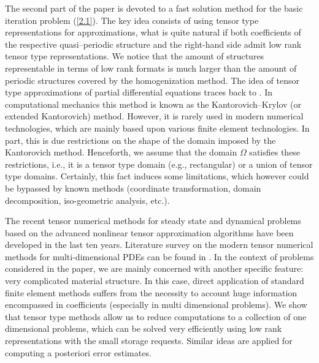 \documentclass[amstex,amstext,amsfonts,epsf,12pt] {amsart}
\begin{document}
The second part of the paper is devoted to a fast solution method for  the basic 
iteration problem (\ref{2.1}). The key idea consists of using 
  tensor type representations for approximations, what is quite natural if 
  both coefficients of the respective quasi--periodic structure and the right-hand side
  admit low rank tensor type representations. 
  We notice  that the amount of structures representable in terms of low rank formats is much
  larger than the amount of  periodic structures covered by the homogenization
  method. The idea of tensor type approximations of partial differential
  equations traces back to \cite{KantorovichKrylov}. In computational
  mechanics this method is known as the Kantorovich--Krylov (or extended Kantorovich) method.
  However, it is rarely used in modern numerical technologies, which are mainly
  based upon various finite element technologies. In part, this is due restrictions
  on the shape of the domain imposed by the Kantorovich method.
  Henceforth, we assume that the domain $\Omega$ satisfies these restrictions,
  i.e.,  it is a tensor type domain (e.g., rectangular) or a union of tensor type domains. 
  Certainly, this fact induces some limitations, which however could be bypassed 
  by known methods (coordinate transformation, domain decomposition, iso-geometric analysis, etc.).
  
  The recent tensor numerical methods for steady state and dynamical problems
  based on the advanced nonlinear tensor approximation algorithms have been developed in the last
  ten years.
  Literature survey on the modern tensor numerical methods for multi-dimensional PDEs
  can be found in \cite{KhorCA:09,KhorSurv:10,VeKhorTromsoe:15}.
  In the context of problems considered in the paper, 
  we are mainly concerned with another specific feature: very complicated material structure. 
  In this case, direct application of standard finite element methods suffers
  from the necessity to account huge information encompassed in coefficients (especially in
  multi dimensional problems). We show that tensor type methods allow us to
  reduce computations to a collection of one dimensional problems, 
  which can be solved very efficiently using low rank representations with the small
  storage requests. 
  Similar ideas are applied  for computing a posteriori   error estimates.
  
\end{document}
